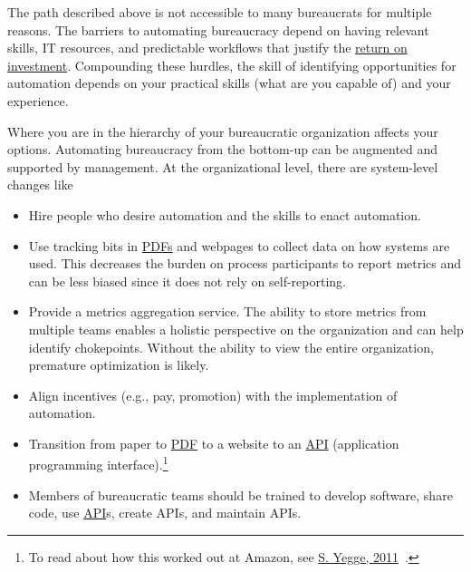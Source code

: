 The path described above is not accessible to many bureaucrats for multiple reasons. 
The barriers to automating bureaucracy depend on having relevant skills, IT resources, and predictable workflows that justify the
\href{https://en.wikipedia.org/wiki/Return_on_investment}{return on investment}. Compounding these hurdles, the skill of identifying opportunities for automation depends on your practical skills (what are you capable of) and your experience.

Where you are in the hierarchy of your bureaucratic organization affects your options. 
Automating bureaucracy from the bottom-up can be augmented and supported by management. 
At the organizational level, there are system-level changes like
\begin{itemize}
    \item Hire people who desire automation and the skills to enact automation.
    \item Use tracking bits in
    \href{https://en.wikipedia.org/wiki/PDF}{PDFs} and webpages to collect data on how systems are used. This decreases the burden on process participants to report metrics and can be less biased since it does not rely on self-reporting.
    \item Provide a metrics aggregation service. The ability to store metrics from multiple teams enables a holistic perspective on the organization and can help identify chokepoints. Without the ability to view the entire organization, premature optimization is likely.
    \item Align incentives (e.g., pay, promotion) with the implementation of automation.
    \item Transition from paper to 
    \href{https://en.wikipedia.org/wiki/PDF}{PDF} 
    to a website to an 
    \href{https://en.wikipedia.org/wiki/API}{API} (application programming interface).\footnote{To read about how this worked out at Amazon, see \href{https://gist.github.com/bhpayne/49c8379a3ea880b7cc079fc8d32c87a7}{S. Yegge, 2011}~\cite{2011_Yegge}.}
    \item Members of bureaucratic teams should be trained to develop software, share code, use \href{https://en.wikipedia.org/wiki/API}{API}s, 
    create APIs, and maintain APIs.
\end{itemize}

